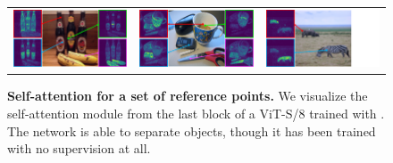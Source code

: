 \begin{figure}[t]
\centering
  \setlength{\tabcolsep}{3pt}
\begin{tabular}{ccc}
\includegraphics[width=0.35\linewidth]{678.pdf}&
\includegraphics[width=0.35\linewidth]{4833.pdf}&
\includegraphics[width=0.35\linewidth]{3296.pdf}\\
\end{tabular}
\caption{
	\textbf{Self-attention for a set of reference points.}
We visualize the self-attention module from the last block of a ViT-S/8 trained with \OURS.
The network is able to separate objects, though it has been trained with no supervision at all.
}
\label{fig:pointing}
\end{figure}

